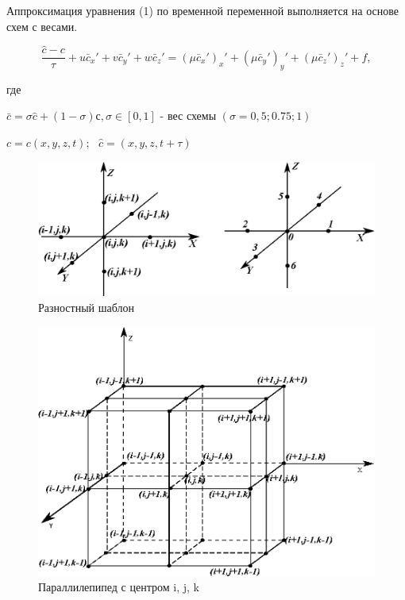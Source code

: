 \documentclass[12pt]{article}
\begin{document}
Аппроксимация уравнения (1) по временной переменной выполняется на основе схем с весами. 

\begin{equation}
	\frac{\hat c - c}{\tau} + u\bar{c}_x' + v\bar{c}_y' + w\bar{c}_z' = (\mu\bar{c}_x')_x' + (\mu\bar{c}_y')_y' + (\mu\bar{c}_z')_z' + f ,		
\end{equation}

где  

$\bar{c} = \sigma\hat c + (1 - \sigma) с , \sigma \in [0,1] $ - вес схемы $(\sigma = 0,5; 0.75; 1)$

$c=c(x, y, z, t);$ $ $ $\hat c = (x, y, z, t + \tau)  $


\begin{figure}[h!]
	\centering
	\includegraphics {figs/shablon}
	\caption{ Разностный шаблон}
\end{figure}

\begin{figure}[h!]
	\centering
	\includegraphics {figs/ris2}
	\caption{ Параллилепипед с центром i, j, k}
\end{figure}
\end{document}
